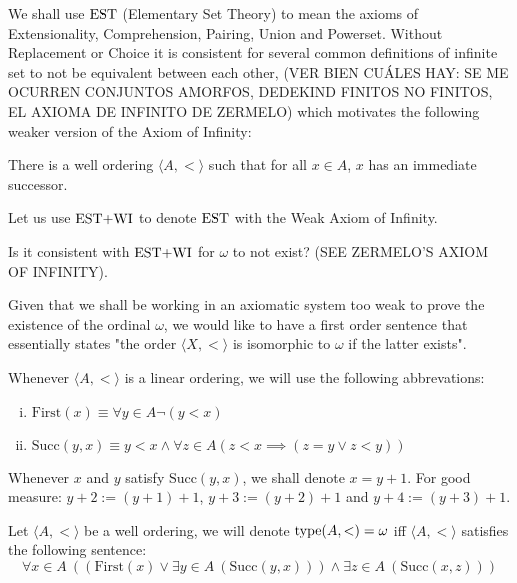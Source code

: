 We shall use $\operatorname{\text{EST}}$ (Elementary Set Theory) to mean the axioms of Extensionality, Comprehension, Pairing, Union and Powerset. 
Without Replacement or Choice it is consistent for several common definitions of infinite set to not be equivalent between each other, 
(VER BIEN CUÁLES HAY: SE ME OCURREN CONJUNTOS AMORFOS, DEDEKIND FINITOS NO FINITOS, EL AXIOMA DE INFINITO DE ZERMELO) which motivates the following weaker version of the Axiom of Infinity:

\begin{WeakInf}
	There is a well ordering $\langle A , < \rangle$ such that for all $x\in A$, $x$ has an immediate successor.
\end{WeakInf}

Let us use $\operatorname{\text{EST+WI}}$ to denote $\operatorname{\text{EST}}$ with the Weak Axiom of Infinity.

\begin{question}
	Is it consistent with $\operatorname{\text{EST+WI}}$ for $\omega$ to not exist? (SEE ZERMELO'S AXIOM OF INFINITY).
\end{question}

Given that we shall be working in an axiomatic system too weak to prove the existence of the ordinal $\omega$, we would like to have a first order sentence that essentially states "the order $\langle X , < \rangle$ is isomorphic to $\omega$ if the latter exists".

\begin{definition}
	Whenever $\langle A,< \rangle$ is a linear ordering, we will use the following abbrevations:
	
	\begin{enumerate}[(i)]
		\item $\text{First}(x) \equiv \forall y \in A \neg(y < x)$
		\item $\text{Succ}(y,x) \equiv y<x \land \forall z\in A (z < x \implies (z=y \lor z < y))$
	\end{enumerate}

	Whenever $x$ and $y$ satisfy $\text{Succ}(y,x)$, we shall denote $x = y+1$. For good measure: $y+2 := (y+1)+1$, $y+3 := (y+2)+1$ and $y+4 := (y+3)+1$.
\end{definition}

\begin{definition}
	\label{omega_type}
	Let $\langle A,< \rangle$ be a well ordering, we will denote $\operatorname{type}(A,<) = \omega$ iff $\langle A,< \rangle$ satisfies the following sentence:
	\[
		\forall x\in A \ ((\text{First}(x) \lor \exists y\in A \ (\text{Succ}(y,x))) \land \exists z\in A \ (\text{Succ}(x,z)))
	\]
\end{definition}

